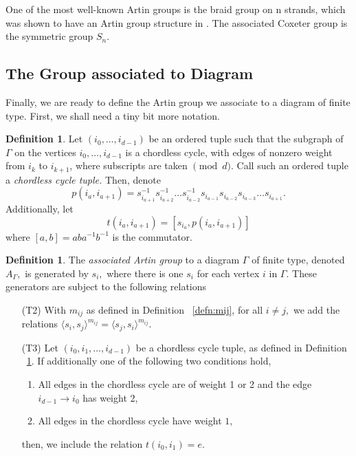 \documentclass[11pt]{amsart}
\theoremstyle{definition}
\newtheorem{defn}[thm]{Definition}
\begin{document}
One of the most well-known Artin groups is the braid group on n strands, which was shown to have an Artin group structure in \cite{FN61}. The associated Coxeter group is the symmetric group $S_{n}$.

\subsection{The Group associated to Diagram}

Finally, we are ready to define the Artin group we associate to a diagram of finite type. First, we shall need a tiny bit more notation.

\begin{defn}
\label{defn:cycle_tuple}
Let $(i_0,\ldots, i_{d-1})$ be an ordered tuple such that the subgraph of $\Gamma$ on the vertices $i_0,\ldots, i_{d-1}$ is a chordless cycle, with edges of nonzero weight from $i_k$ to $i_{k+1}$, where subscripts are taken $\pmod d.$ Call such an ordered tuple a {\it chordless cycle tuple.} Then, denote $$p(i_a,i_{a+1}) = s_{i_{a+1}}^{-1}s_{i_{a+2}}^{-1}\dots s_{i_{a-2}}^{-1}s_{i_{a-1}}s_{i_{a-2}}s_{i_{a-3}}\dots s_{i_{a+1}}.$$ Additionally, let $$t(i_a,i_{a+1}) = [s_{i_a},p(i_a,i_{a+1})]$$ where $[a,b] = aba^{-1}b^{-1}$ is the commutator.
\end{defn}

\begin{defn} \label{grp def}
The {\it associated Artin group} to a diagram $\Gamma$ of finite type, denoted $A_\Gamma,$ is generated by $s_i,$ where there is one $s_i$ for each vertex $i$ in $\Gamma.$ These generators are subject to the following relations
\begin{itemize}
\item[(T2)] With $m_{ij}$ as defined in Definition ~\ref{defn:mij}, for all $i \neq j,$ we add the relations
$\langle s_i,s_j \rangle^{m_{ij}}= \langle s_j,s_i \rangle^{m_{ij}}.$

\item[(T3)] Let $(i_0,i_1,\ldots,i_{d-1})$ be a chordless cycle tuple, as defined in Definition ~\ref{defn:cycle_tuple}. If additionally one of the following two conditions hold,
\begin{enumerate}
\item All edges in the chordless cycle are of weight 1 or 2 and the edge $i_{d-1}\rightarrow i_0$ has weight 2,
\item All edges in the chordless cycle have weight $1,$
\end{enumerate}
then, we include the relation
$t(i_0,i_1)=e.$
\end{itemize}
\end{defn}
\end{document}
